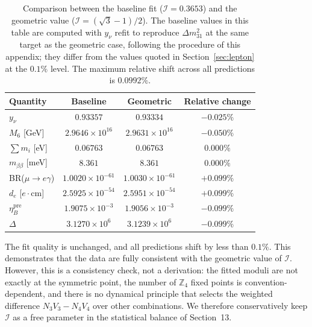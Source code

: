\documentclass[12pt,a4paper]{article}
\numberwithin{equation}{section}
\begin{document}
\begin{table}[H]
\centering
\caption{Comparison between the baseline fit (\(\mathcal I = 0.3653\)) and the geometric value (\(\mathcal I = (\sqrt{3}-1)/2\)). The baseline values in this table are computed with \(y_\nu\) refit to reproduce \(\Delta m^2_{31}\) at the same target as the geometric case, following the procedure of this appendix; they differ from the values quoted in Section~\ref{sec:lepton} at the \(0.1\%\) level. The maximum relative shift across all predictions is \(0.0992\%\).}
\label{tab:I_check}
\begin{tabular}{lccc}
\toprule
Quantity & Baseline & Geometric & Relative change \\
\midrule
\(y_\nu\) & \(0.93357\) & \(0.93334\) & \(-0.025\%\) \\
\(M_6\) [GeV] & \(2.9646\times 10^{16}\) & \(2.9631\times 10^{16}\) & \(-0.050\%\) \\
\(\sum m_i\) [eV] & \(0.06763\) & \(0.06763\) & \(0.000\%\) \\
\(m_{\beta\beta}\) [meV] & \(8.361\) & \(8.361\) & \(0.000\%\) \\
BR(\(\mu\to e\gamma\)) & \(1.0020\times 10^{-61}\) & \(1.0030\times 10^{-61}\) & \(+0.099\%\) \\
\(d_e\) [\(e\cdot\mathrm{cm}\)] & \(2.5925\times 10^{-54}\) & \(2.5951\times 10^{-54}\) & \(+0.099\%\) \\
\(\eta_B^{\mathrm{pre}}\) & \(1.9075\times 10^{-3}\) & \(1.9056\times 10^{-3}\) & \(-0.099\%\) \\
\(\Delta\) & \(3.1270\times 10^6\) & \(3.1239\times 10^6\) & \(-0.099\%\) \\
\bottomrule
\end{tabular}
\end{table}

The fit quality is unchanged, and all predictions shift by less than \(0.1\%\). This demonstrates that the data are fully consistent with the geometric value of \(\mathcal I\). However, this is a consistency check, not a derivation: the fitted moduli are not exactly at the symmetric point, the number of \(\mathbb Z_4\) fixed points is convention-dependent, and there is no dynamical principle that selects the weighted difference \(N_3 V_3 - N_4 V_4\) over other combinations. We therefore conservatively keep \(\mathcal I\) as a free parameter in the statistical balance of Section~13.
\end{document}
